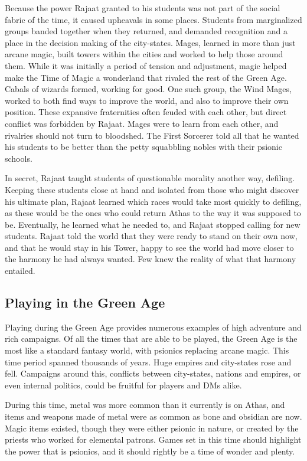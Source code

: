 Because the power Rajaat granted to his students was not part of the social fabric of the time, it caused upheavals in some places. Students from marginalized groups banded together when they returned, and demanded recognition and a place in the decision making of the city-states. Mages, learned in more than just arcane magic, built towers within the cities and worked to help those around them. While it was initially a period of tension and adjustment, magic helped make the Time of Magic a wonderland that rivaled the rest of the Green Age. Cabals of wizards formed, working for good. One such group, the Wind Mages, worked to both find ways to improve the world, and also to improve their own position. These expansive fraternities often feuded with each other, but direct conflict was forbidden by Rajaat. Mages were to learn from each other, and rivalries should not turn to bloodshed. The First Sorcerer told all that he wanted his students to be better than the petty squabbling nobles with their psionic schools.

In secret, Rajaat taught students of questionable morality another way, defiling. Keeping these students close at hand and isolated from those who might discover his ultimate plan, Rajaat learned which races would take most quickly to defiling, as these would be the ones who could return Athas to the way it was supposed to be. Eventually, he learned what he needed to, and Rajaat stopped calling for new students. Rajaat told the world that they were ready to stand on their own now, and that he would stay in his Tower, happy to see the world had move closer to the harmony he had always wanted. Few knew the reality of what that harmony entailed.

\subsection{Playing in the Green Age}
Playing during the Green Age provides numerous examples of high adventure and rich campaigns. Of all the times that are able to be played, the Green Age is the most like a standard fantasy world, with psionics replacing arcane magic. This time period spanned thousands of years. Huge empires and city-states rose and fell. Campaigns around this, conflicts between city-states, nations and empires, or even internal politics, could be fruitful for players and DMs alike.

During this time, metal was more common than it currently is on Athas, and items and weapons made of metal were as common as bone and obsidian are now. Magic items existed, though they were either psionic in nature, or created by the priests who worked for elemental patrons. Games set in this time should highlight the power that is psionics, and it should rightly be a time of wonder and plenty.

